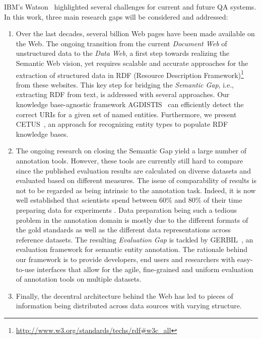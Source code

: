 IBM's Watson~\cite{watson} highlighted several challenges for current and future QA systems.
In this work, three main research gaps will be considered and addressed:
\begin{enumerate}
\item 
Over the last decades, several billion Web pages have been made available on the Web. 
The ongoing transition from the current \emph{Document Web} of unstructured data to the \emph{Data Web}, a first step towards realizing the Semantic Web vision, yet requires scalable and accurate approaches for the extraction of structured data in RDF (Resource Description Framework)\footnote{\url{http://www.w3.org/standards/techs/rdf\#w3c_all}} from these websites.
This key step for bridging the \emph{Semantic Gap}, i.e., extracting RDF from text, is addressed  with several approaches.
Our knowledge base-agnostic framework AGDISTIS~\cite{agdistis_iswc} can efficiently detect the correct URIs for a given set of named entities.
Furthermore, we present CETUS~\cite{CETUS_2015}, an approach for recognizing entity types to populate RDF knowledge bases. 
\item 
The ongoing research on closing the Semantic Gap yield a large number of annotation tools.
However, these tools are currently still hard to compare since the published evaluation results are calculated on diverse datasets and evaluated based on different measures.
The issue of  comparability of results is not to be regarded as being intrinsic to the annotation task. 
Indeed, it is now well established that scientists spend between 60\% and 80\% of their time preparing data for experiments \cite{GIL2014,jermyn1999preparing,peng2011reproducible}. Data preparation being such a tedious problem in the annotation domain is mostly due to the different formats of the gold standards as well as the different data representations across reference datasets.
The resulting \emph{Evaluation Gap} is tackled by GERBIL~\cite{GERBIL}, an evaluation framework for semantic entity annotation. The rationale behind our framework is to provide developers, end users and researchers with easy-to-use interfaces that allow for the agile, fine-grained and uniform evaluation of annotation tools on multiple datasets.
\item 
Finally, the decentral architecture behind the Web has led to pieces of information being distributed across data sources with varying structure. 

\end{enumerate}
